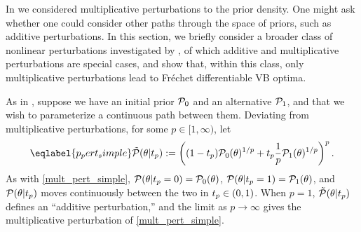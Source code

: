 In  we considered
multiplicative perturbations to the prior density.  One might ask whether one
could consider other paths through the space of priors, such as additive
perturbations.  In this section, we briefly consider a broader class of
nonlinear perturbations investigated by \citet{gustafson:1996:local}, of which
additive and multiplicative perturbations are special cases, and show that,
within this class, only multiplicative perturbations lead to Fr{\'e}chet
differentiable VB optima.

As in , suppose we have an initial prior $\mathcal{P}_{0}$
and an alternative $\mathcal{P}_{1}$, and that we wish to parameterize a continuous path
between them.  Deviating from multiplicative perturbations, for some $p \in [1,
\infty)$, let
%
\begin{align}\eqlabel{p_pert_simple}
%
\ptil(\theta \vert \tp) :=
    \left((1 - \tp)\pbase(\theta)^{1/p} +
    \tp \frac{1}{p}\palt(\theta)^{1/p} \right)^{p}.
%
\end{align}
%
As with \eqref{mult_pert_simple}, $\mathcal{P}(\theta \vert t_{p} = 0) = \mathcal{P}_{0}(\theta)$,
$\mathcal{P}(\theta \vert t_{p} = 1) = \mathcal{P}_{1}(\theta)$, and $\mathcal{P}(\theta \vert t_{p})$ moves
continuously between the two in $t_{p} \in (0, 1)$.  When $p = 1$,
$\tilde{\mathcal{P}}(\theta \vert t_{p})$ defines an ``additive perturbation,'' and
the limit as $p \rightarrow \infty$ gives the multiplicative perturbation
of \eqref{mult_pert_simple}.

